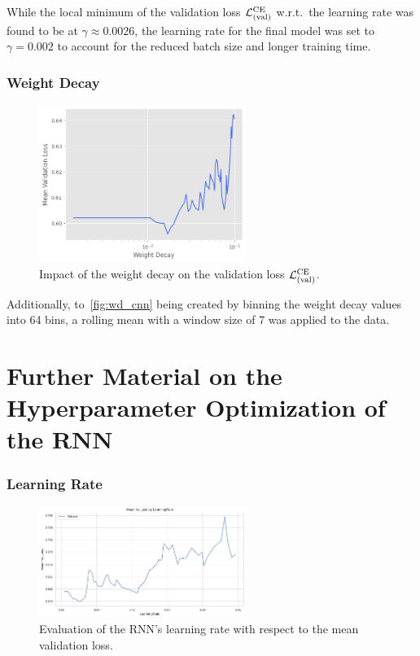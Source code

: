 While the local minimum of the validation loss \( \mathcal{L}_{(\text{val})}^{\text{CE}} \) w.r.t.\ the learning rate was found to be at \( \gamma \approx 0.0026 \),
the learning rate for the final model was set to \( \gamma = 0.002 \) to account for the reduced batch size and longer training time.

\subsubsection{Weight Decay}

\begin{figure}[H]
    \centering
    \includegraphics[width=0.6\textwidth]{figures/06_ModelExploration/4_CNN/conv_weighdecay_bin64_roll7_valloss.png}
    \caption{Impact of the weight decay on the validation loss \( \mathcal{L}_{(\text{val})}^{\text{CE}} \).}
    \label{fig:wd_cnn}
\end{figure}
Additionally, to~\autoref{fig:wd_cnn} being created by binning the weight decay values into 64 bins, a rolling mean with
a window size of 7 was applied to the data.

\section{Further Material on the Hyperparameter Optimization of the RNN}
\label{app:sec:FurtherCNN}
\subsubsection{Learning Rate}
\begin{figure}[H]
    \centering
    \includegraphics[width=0.6\textwidth]{figures/06_ModelExploration/RNN/rnn_learning_rate.png}
    \caption{Evaluation of the RNN's learning rate with respect to the mean validation loss.}
    \label{fig:rnn_lerning_rate}
\end{figure}

